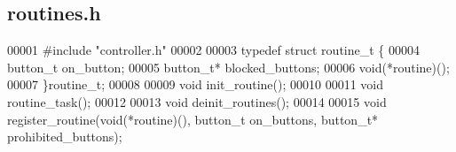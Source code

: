 \subsection{routines.\+h}
\label{a00059_source}

\begin{DoxyCode}
00001 \textcolor{preprocessor}{#include "controller.h"}
00002 
00003 \textcolor{keyword}{typedef} \textcolor{keyword}{struct }routine_t \{
00004   button_t on_button;
00005   button_t* blocked_buttons;
00006   void(*routine)();
00007 \}routine_t;
00008 
00009 \textcolor{keywordtype}{void} init_routine();
00010 
00011 \textcolor{keywordtype}{void} routine_task();
00012 
00013 \textcolor{keywordtype}{void} deinit_routines();
00014 
00015 \textcolor{keywordtype}{void} register_routine(\textcolor{keywordtype}{void}(*routine)(), button_t on\_buttons, button_t* prohibited\_buttons);
\end{DoxyCode}
